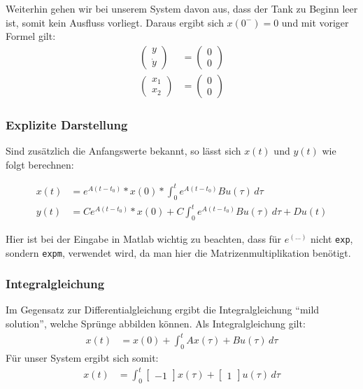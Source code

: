 Weiterhin gehen wir bei unserem System davon aus, dass der Tank zu Beginn leer ist, somit kein Ausfluss vorliegt. Daraus ergibt sich $x(0^-) = 0$ und mit voriger Formel gilt:
\begin{align*}
    \left(\begin{array}{c} y \\ \dot y \end{array}\right) &= \left(\begin{array}{c}0\\0\end{array}\right) \\
    \left(\begin{array}{c} x_1 \\ x_2 \end{array}\right) &= \left(\begin{array}{c}0\\0\end{array}\right)
\end{align*}


\subsubsection{Explizite Darstellung}

Sind zusätzlich die Anfangswerte bekannt, so lässt sich $x(t)$ und $y(t)$ wie folgt berechnen:

\begin{align*}
    x(t) & = e^{A(t-t_0)} * x(0) * \int_{0}^{t} e^{A(t-t_0)}Bu(\tau) \,d\tau \nonumber \\
    y(t) & = Ce^{A(t-t_0)} * x(0) + C \int_{0}^{t} e^{A(t-t_0)}Bu(\tau) \,d\tau + Du(t)
\end{align*}

Hier ist bei der Eingabe in Matlab wichtig zu beachten, dass für $e^{(\ldots)}$ nicht \texttt{exp}, sondern \texttt{expm}, verwendet wird, da man hier die Matrizenmultiplikation benötigt.


\subsubsection{Integralgleichung}
Im Gegensatz zur Differentialgleichung ergibt die Integralgleichung \enquote{mild solution}, welche Sprünge abbilden können.
Als Integralgleichung gilt:
\begin{align*}
    x(t) & = x(0) + \int_{0}^{t} Ax(\tau) + Bu(\tau)\,d\tau
\end{align*}
Für unser System ergibt sich somit:
\begin{align*}
    x(t) & = \int_{0}^{t} \begin{bmatrix}
        -1
    \end{bmatrix}x(\tau) + \begin{bmatrix}
        1
    \end{bmatrix}u(\tau)\,d\tau
\end{align*}

